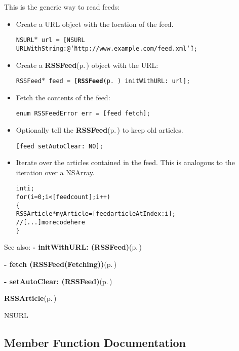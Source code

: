 This is the generic way to read feeds:

\begin{itemize}
\item Create a URL object with the location of the feed.\par
 {\tt  NSURL$\ast$ url = [NSURL URLWith\-String:@\char`\"{}http://www.example.com/feed.xml\char`\"{}]; }  \item Create a {\bf RSSFeed}{\rm (p.\,\pageref{classRSSFeed})} object with the URL:\par
 {\tt  RSSFeed$\ast$ feed = [{\bf RSSFeed}{\rm (p.\,\pageref{classRSSFeed})} init\-With\-URL: url]; }  \item Fetch the contents of the feed:\par
 {\tt  enum RSSFeed\-Error err = [feed fetch]; }  \item Optionally tell the {\bf RSSFeed}{\rm (p.\,\pageref{classRSSFeed})} to keep old articles.\par
 {\tt  [feed set\-Auto\-Clear: NO]; }  \item Iterate over the articles contained in the feed. This is analogous to the iteration over a NSArray. \small\begin{alltt}
      int i;
      for (i=0; i<[feed count]; i++)
        \{
          RSSArticle* myArticle = [feed articleAtIndex: i];
          // [...] more code here
        \}
    \end{alltt}\normalsize 
  \end{itemize}


\begin{Desc}
\item[See also:]{\bf - init\-With\-URL: (RSSFeed)}{\rm (p.\,\pageref{classRSSFeed_c903aac5615dd840869a78c0f599ba4f})} 

{\bf - fetch (RSSFeed(Fetching))}{\rm (p.\,\pageref{categoryRSSFeed(Fetching)_34234d6ccb4ece076ae6ec3d86fb7f46})} 

{\bf - set\-Auto\-Clear: (RSSFeed)}{\rm (p.\,\pageref{classRSSFeed_2931b0bdee68292f638f0bc500e1662e})}

{\bf RSSArticle}{\rm (p.\,\pageref{interfaceRSSArticle})} 

NSURL \end{Desc}




\subsection{Member Function Documentation}
